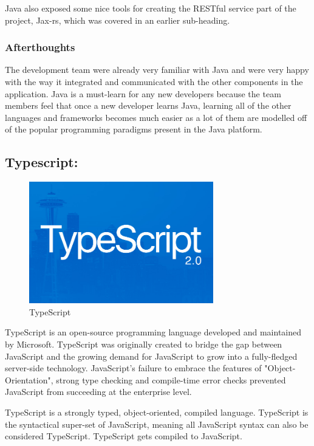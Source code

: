 Java also exposed some nice tools for creating the RESTful service part of the project, Jax-rs, which was covered in an earlier sub-heading. 

\subsubsection{Afterthoughts}
The development team were already very familiar with Java and were very happy with the way it integrated and communicated with the other components in the application. Java is a must-learn for any new developers because the team members feel that once a new developer learns Java, learning all of the other languages and frameworks becomes much easier as a lot of them are modelled off of the popular programming paradigms present in the Java platform. 



\subsection{Typescript:}
\label{sec:TechnologyReviewTypescript}

\begin{figure}[H]
    \centering
    \includegraphics[width=\textwidth, height=150pt]{img/TypeScriptLogo.PNG}
    \caption{TypeScript}
    \label{fig:my_label}
\end{figure}

\bigskip

TypeScript is an open-source programming language developed and maintained by Microsoft. TypeScript was originally created to bridge the gap between JavaScript and the growing demand for JavaScript to grow into a fully-fledged server-side technology. JavaScript's failure to embrace the features of "Object-Orientation", strong type checking and compile-time error checks prevented JavaScript from succeeding at the enterprise level. 

TypeScript is a strongly typed, object-oriented, compiled language. TypeScript is the syntactical super-set of JavaScript, meaning all JavaScript syntax can also be considered TypeScript. TypeScript gets compiled to JavaScript. 

